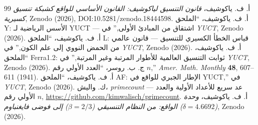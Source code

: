 \documentclass[11pt,a4paper]{article}
\begin{document}
	\begin{thebibliography}{99}
		أ. ف. ياكوشيف، \emph{قانون التنسيق لياكوشيف: القانون الأساسي للواقع كشبكة تنسيق كسيرية}, Zenodo (2026), DOI:10.5281/zenodo.18444598.
		أ. ف. ياكوشيف، ``الملحق Y: الأسس الرياضية لـ YUCT — اشتقاق من المبادئ الأولى,'' في \emph{YUCT}, Zenodo (2026).
		أ. ف. ياكوشيف، ``الملحق L: قياس الخطأ الكسيري للتنسيق — قانون عالمي من الحمض النووي إلى علم الكون,'' في \emph{YUCT}, Zenodo (2026).
		أ. ف. ياكوشيف، ``الملحق Ferra1.2: ثوابت التنسيق العالمية للأطوار المرتبة وغير المرتبة,'' في \emph{YUCT}, Zenodo (2026).
		ج. ب. روسر، ``العدد الأولي رقم $n$,'' \emph{Amer. Math. Monthly} \textbf{48}, 607--611 (1941).
		أ. ف. ياكوشيف، ``الملحق AF: الإطار الجبري للواقع في YUCT,'' في \emph{YUCT}, Zenodo (2026).
		ك. واليش، \emph{primecount} — عد سريع للأعداد الأولية والعدد الأولي رقم $n$, \url{https://github.com/kimwalisch/primecount}.
		أ. ف. ياكوشيف، \emph{وحدة الواقع: من النظام التنسيقي ($\beta=2/3$) إلى فوضى فايغنباوم ($\delta=4.6692$)}, Zenodo (2026).
	\end{thebibliography}
	
\end{document}
